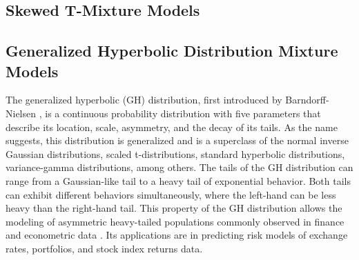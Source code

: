 \subsection{Skewed T-Mixture Models}
\label{sec:skewedtmix_ch3}

\subsection{Generalized Hyperbolic Distribution Mixture Models}
\label{sec:ghd_ch3}
The generalized hyperbolic (GH) distribution, first introduced by Barndorff-Nielsen \cite{Barndorff1977}, is a continuous probability distribution with five parameters that describe its location, scale, asymmetry, and the decay of its tails. As the name suggests, this distribution is generalized and is a superclass of the normal inverse Gaussian distributions, scaled t-distributions, standard hyperbolic distributions, variance-gamma distributions, among others. The tails of the GH distribution can range from a Gaussian-like tail to a heavy tail of exponential behavior. Both tails can exhibit different behaviors simultaneously, where the left-hand can be less heavy than the right-hand tail. This property of the GH distribution allows the modeling of asymmetric heavy-tailed populations commonly observed in finance and econometric data \cite{Takahashi2016, Nwobi2014, Necula2009, Aas2006, Bibby2003}. Its applications are in predicting risk models of exchange rates, portfolios, and stock index returns data. 

